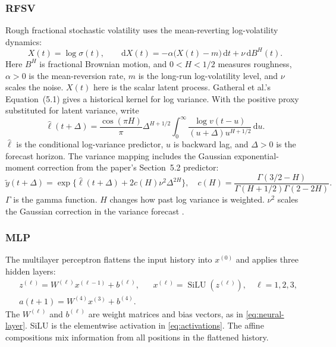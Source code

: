 \documentclass[12pt,a4paper]{article}
\numberwithin{equation}{section}
\numberwithin{table}{section}
\numberwithin{figure}{section}
\begin{document}
\subsubsection{RFSV}
Rough fractional stochastic volatility uses the mean-reverting log-volatility dynamics:
\begin{equation}\label{eq:methods-rfsv-dynamics}
X(t)=\log\sigma(t),\qquad
\mathrm dX(t)=-\alpha\bigl(X(t)-m\bigr)\,\mathrm dt+\nu\,\mathrm dB^H(t).
\end{equation}
Here $B^H$ is fractional Brownian motion, and $0<H<1/2$ measures roughness, $\alpha>0$ is the mean-reversion rate, $m$ is the long-run log-volatility level, and $\nu$ scales the noise. $X(t)$ here is the scalar latent process. Gatheral et al.'s Equation~(5.1) gives a historical kernel for log variance. With the positive proxy substituted for latent variance, write
\begin{equation}\label{eq:methods-rfsv-kernel}
\widehat\ell(t+\Delta)=\frac{\cos(\pi H)}{\pi}\Delta^{H+1/2}
\int_0^{\infty}\frac{\log v(t-u)}{(u+\Delta)u^{H+1/2}}\,\mathrm du.
\end{equation}
$\widehat\ell$ is the conditional log-variance predictor, $u$ is backward lag, and $\Delta>0$ is the forecast horizon. The variance mapping includes the Gaussian exponential-moment correction from the paper's Section~5.2 predictor:
\begin{equation}\label{eq:methods-rfsv-variance}
\widetilde y(t+\Delta)=\exp\{\widehat\ell(t+\Delta)+2c(H)\nu^2\Delta^{2H}\},
\quad c(H)=\frac{\Gamma(3/2-H)}{\Gamma(H+1/2)\Gamma(2-2H)}.
\end{equation}
$\Gamma$ is the gamma function. $H$ changes how past log variance is weighted. $\nu^2$ scales the Gaussian correction in the variance forecast \cite{gatheral2018}.

\subsubsection{MLP}
The multilayer perceptron flattens the input history into $x^{(0)}$ and applies three hidden layers:
\begin{equation}\label{eq:methods-mlp}
\begin{aligned}
&z^{(\ell)}=W^{(\ell)}x^{(\ell-1)}+b^{(\ell)},&
&x^{(\ell)}=\operatorname{SiLU}(z^{(\ell)}),\quad \ell=1,2,3,\\
&a(t+1)=W^{(4)}x^{(3)}+b^{(4)}.
\end{aligned}
\end{equation}
The $W^{(\ell)}$ and $b^{(\ell)}$ are weight matrices and bias vectors, as in \eqref{eq:neural-layer}. SiLU is the elementwise activation in \eqref{eq:activations}. The affine compositions mix information from all positions in the flattened history.
\end{document}
